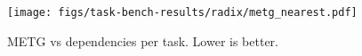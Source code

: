 \begin{figure}[t]
\centering
\texttt{[image: figs/task-bench-results/radix/metg\_nearest.pdf]}
\caption{METG vs dependencies per task. Lower is better.\label{fig:radix}}
\end{figure}
